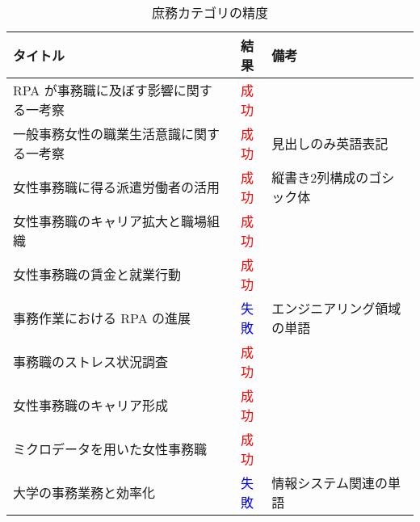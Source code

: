 \begin{table}[h]
  \label{tab:doc_operation}
  \begin{center}
  \begin{tabular}{|l|c|l|}
    \hline
    \textbf{タイトル} & \textbf{結果} & \textbf{備考} \\ \hline
    RPA が事務職に及ぼす影響に関する一考察 & \textcolor{red}{成功} & \\ \hline
    一般事務女性の職業生活意識に関する一考察 & \textcolor{red}{成功} & 見出しのみ英語表記 \\ \hline
    女性事務職に得る派遣労働者の活用 & \textcolor{red}{成功} & 縦書き2列構成のゴシック体 \\ \hline
    女性事務職のキャリア拡大と職場組織 & \textcolor{red}{成功} & \\ \hline
    女性事務職の賃金と就業行動 & \textcolor{red}{成功} & \\ \hline
    事務作業における RPA の進展 & \textcolor{blue}{失敗} & エンジニアリング領域の単語 \\ \hline
    事務職のストレス状況調査 & \textcolor{red}{成功} & \\ \hline
    女性事務職のキャリア形成 & \textcolor{red}{成功} & \\ \hline
    ミクロデータを用いた女性事務職 & \textcolor{red}{成功} & \\ \hline
    大学の事務業務と効率化 & \textcolor{blue}{失敗} & 情報システム関連の単語 \\ \hline
  \end{tabular}
  \end{center}
  \caption{庶務カテゴリの精度}
\end{table}

